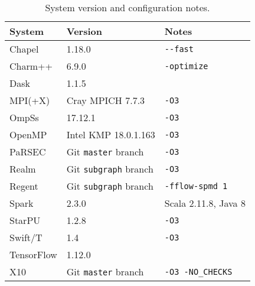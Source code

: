 \begin{table}[t]
\begin{tabular}{l | l | l}
System & Version & Notes \\
\hline
Chapel & 1.18.0 & {\lstinline!--fast!} \\
Charm++ & 6.9.0 & {\lstinline!-optimize!} \\
Dask & 1.1.5 & \\
MPI(+X) & Cray MPICH 7.7.3 & {\lstinline!-O3!} \\
OmpSs & 17.12.1 & {\lstinline!-O3!} \\
OpenMP & Intel KMP 18.0.1.163 & {\lstinline!-O3!} \\
PaRSEC & Git {\lstinline!master!} branch & {\lstinline!-O3!} \\
Realm & Git {\lstinline!subgraph!} branch & {\lstinline!-O3!} \\
Regent & Git {\lstinline!subgraph!} branch & {\lstinline!-fflow-spmd 1!} \\
Spark & 2.3.0 & Scala 2.11.8, Java 8 \\
StarPU & 1.2.8 & {\lstinline!-O3!} \\
Swift/T & 1.4 & {\lstinline!-O3!} \\
TensorFlow & 1.12.0 & \\
X10 & Git {\lstinline!master!} branch & {\lstinline!-O3 -NO_CHECKS!}
\end{tabular}

\caption{System version and configuration notes.\label{tab:flags}}
\vspace{-0.5cm}
\end{table}
